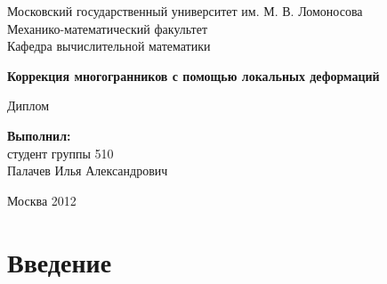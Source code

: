 \documentclass[a4paper,12pt, titlepage]{article}
\begin{document}
\begin{titlepage}
\begin{center}
Московский государственный университет им. М. В. Ломоносова\\

Механико-математический факультет\\
Кафедра вычислительной математики\\
\end{center}

\vspace{5cm}

\begin{center}
\LARGE \bf{Коррекция многогранников с помощью локальных деформаций}
\end{center}

\begin{center}\large
Диплом
\end{center}

\vspace{3cm}

\large
\begin{flushright}
\textbf{Выполнил:}\\
студент группы 510\\
Палачев Илья Александрович\\

\vspace{1cm}


\end{flushright}

\vspace{1cm}

\begin{center}
Москва 2012
\end{center}

\end{titlepage}

\tableofcontents

\newpage
\section{Введение}
\end{document}
